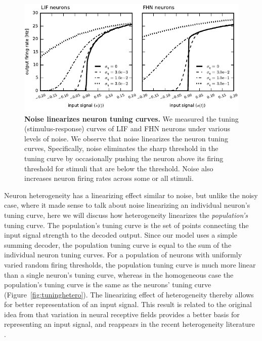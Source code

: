 \documentclass[12pt]{article}
\begin{document}
\begin{figure}
  \ifx\hidefigures\undefined
    \centering
    \includegraphics[width=\textwidth]{figure7_tuningnoisy.pdf}
  \fi
  \caption{
    \textbf{Noise linearizes neuron tuning curves.}
    We measured the tuning (stimulus-response) curves of LIF and FHN neurons under various levels of noise.
    We observe that noise linearizes the neuron tuning curves,
    Specifically, noise eliminates the sharp threshold in the tuning curve by
    occasionally pushing the neuron above its firing threshold
    for stimuli that are below the threshold.
    Noise also increases neuron firing rates across some or all stimuli.
  }
  \label{fig:tuning}
\end{figure}

Neuron heterogeneity has a linearizing effect similar to noise,
but unlike the noisy case,
where it made sense to talk about noise
linearizing an individual neuron's tuning curve,
here we will discuss how heterogeneity
linearizes the \emph{population's} tuning curve.
The population's tuning curve is the set of points
connecting the input signal strength to the decoded output.
Since our model uses a simple summing decoder,
the population tuning curve is equal to
the sum of the individual neuron tuning curves.
For a population of neurons with uniformly varied random firing thresholds,
the population tuning curve is much more linear
than a single neuron's tuning curve,
whereas in the homogeneous case the population's tuning curve
is the same as the neurons' tuning curve (Figure~\ref{fig:tuninghetero}).
The linearizing effect of heterogeneity
thereby allows for better representation of an input signal.
This result is related to the original idea from \cite{Hubel1962}
that variation in neural receptive fields
provides a better basis for representing an input signal,
and reappears in the recent heterogeneity literature \citep{Angelo2012}.
\end{document}
